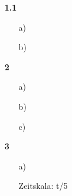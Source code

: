 \documentclass[a4paper,11pt]{article}
\author{\authorinfo}
\title{\titleinfo}
\date{\today}
\begin{document}
\maketitle


\begin{enumerate}
\item[\textbf{1.1}]

\begin{itemize}
    \item[a)]

    \item[b)]
\end{itemize}

\item[\textbf{2}]

\begin{itemize}
    \item[a)]

    \item[b)]

    \item[c)] 
\end{itemize}

\item[\textbf{3}]

\begin{itemize}
    \item[a)]

    Zeitskala: t/5

    \begin{blockgraph}{34}{4}{0.4} %






\end{blockgraph}
\end{itemize}

\end{enumerate}
\end{document}
